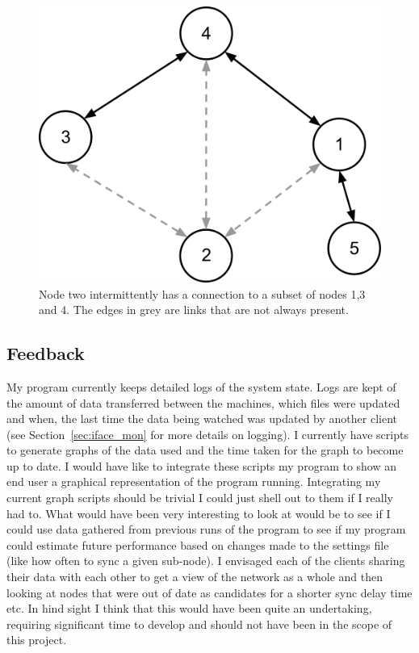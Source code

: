 \documentclass[12pt]{article}
\begin{document}
\begin{figure}[htp]
    \centering
    \includegraphics[scale=0.5]{images/mobile-node.png}
    \caption{Node two intermittently has a connection to a subset
    of nodes 1,3 and 4. The edges in grey are links that are not
    always present.}
    \label{fig:mobile_node}
\end{figure}

\pagebreak

\subsection{Feedback}
\label{sec:feedback}
My program currently keeps detailed logs of the
system state. Logs are kept of the amount of data
transferred between the machines, which files were updated
and when, the last time the data being watched was updated
by another client (see Section~\ref{sec:iface_mon} for more details
on logging).
I currently have scripts to generate graphs of the data used
and the time taken for the graph to become up to date.
I would have like to integrate these scripts my program
to show an end user a graphical representation of the
program running. Integrating my current graph scripts
should be trivial I could just shell out to them if
I really had to. What would have been very interesting
to look at would be to see if I could use data gathered
from previous runs of the program to see if my program
could estimate future performance based on changes
made to the settings file (like how often to sync a
given sub-node). I envisaged each of the clients
sharing their data with each other to get a view
of the network as a whole and then looking at nodes
that were out of date as candidates for a shorter
sync delay time etc. In hind sight I think that this
would have been quite an undertaking, requiring
significant time to develop and should not have
been in the scope of this project.
\end{document}
